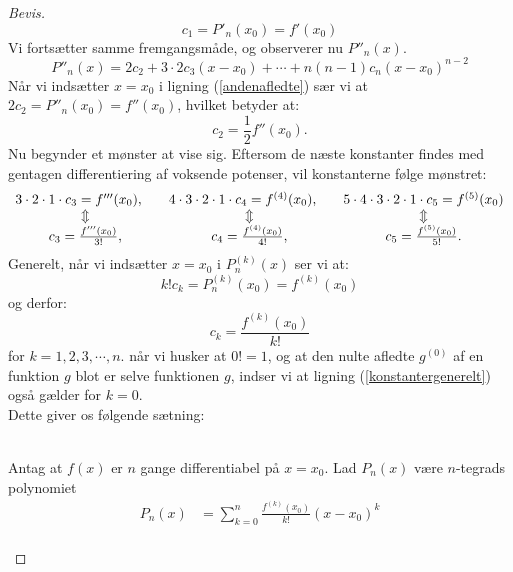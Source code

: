 \documentclass[12pt, a4paper]{article}
\begin{document}
\begin{refsection}
\begin{proof}[Bevis]
\begin{equation*}
    c_1=P'_n(x_0)=f'(x_0)
\end{equation*}
Vi fortsætter samme fremgangsmåde, og observerer nu $P''_n(x)$.
\begin{equation}\label{andenafledte}
    P''_n(x)=2c_2+ 3\cdot2c_3(x-x_0)+\cdots+n(n-1)c_n(x-x_0)^{n-2}
\end{equation}
Når vi indsætter $x=x_0$ i ligning (\ref{andenafledte}) sær vi at $2c_2 = P''_n(x_0)=f''(x_0)$, hvilket betyder at:
\begin{equation*}
    c_2=\frac{1}{2}f''(x_0).
\end{equation*}
Nu begynder et mønster at vise sig. Eftersom de næste konstanter findes med gentagen differentiering af voksende potenser, vil konstanterne følge mønstret: 
\begin{equation*}
    \begin{array}{c c c}
        3\cdot2\cdot1\cdot c_3=f'''(x_0),\quad &4\cdot3\cdot2\cdot1\cdot c_4=f^{(4)}(x_0),\quad&5\cdot4\cdot3\cdot2\cdot1\cdot c_5=f^{(5)}(x_0)\\
        \Updownarrow&\Updownarrow&\Updownarrow\\
        c_3=\frac{f'''(x_0)}{3!},&c_4=\frac{f^{(4)}(x_0)}{4!},&c_5=\frac{f^{(5)}(x_0)}{5!}.
    \end{array}
\end{equation*}
Generelt, når vi indsætter $x=x_0$ i $P_n^{(k)}(x)$ ser vi at:
\begin{equation*}
    k!c_k=P_n^{(k)}(x_0)=f^{(k)}(x_0)
\end{equation*}
og derfor:
\begin{equation}\label{konstantergenerelt}
    \boxed{c_k=\frac{f^{(k)}(x_0)}{k!}}
\end{equation}
for $k=1,2,3,\cdots,n$. når vi husker at $0!=1$, og at den nulte afledte  $g^{(0)}$ af en funktion $g$ blot er selve funktionen $g$, indser vi at ligning (\ref{konstantergenerelt}) også gælder for $k=0$.\\
Dette giver os følgende sætning:\\
\\
   \begin{savenotes}
\begin{mdframed}
Antag at $f(x)$ er $n$ gange differentiabel på $x=x_0$. Lad $P_n(x)$ være $n$-tegrads polynomiet
\begin{equation}\label{taylorpolynomier}
    \begin{aligned}
        P_n(x)&=\sum_{k=0}^n\frac{f^{(k)}(x_0)}{k!}(x-x_0)^k\\

\end{aligned}
\end{equation}
\end{mdframed}
\end{savenotes}
\end{proof}
\end{refsection}
\end{document}
